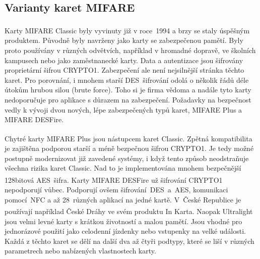 \subsection{Varianty karet MIFARE}

Karty MIFARE Classic\textsuperscript{\textregistered} byly vyvinuty již v roce~1994 a brzy se staly úspěšným produktem. Původně byly navrženy jako karty se zabezpečenou pamětí. Byly proto používány v různých odvětvích, například v hromadné dopravě, ve školních kampusech nebo jako zaměstnanecké karty. Data a autentizace jsou šifrovány proprietární šifrou CRYPTO1. Zabezpečení ale není nejsilnější stránka těchto karet. Pro porovnání, i mnohem starší DES~šifrování odolá o několik řádů déle útokům hrubou silou (brute force). Toho si je firma vědoma a nadále tyto karty nedoporučuje pro aplikace s důrazem na zabezpečení. Požadavky na bezpečnost vedly k vývoji dvou nových, lépe zabezpečených typů karet, MIFARE Plus a MIFARE DESFire\cite{Mifare_Classic_story}\cite{MIFARE_Classic_Official_about}. 
\par
Chytré karty MIFARE Plus\textsuperscript{\textregistered} jsou nástupcem karet Classic. Zpětná kompatibilita je zajištěna podporou starší a méně bezpečnou šifrou CRYPTO1. Je tedy možné postupně modernizovat již zavedené systémy, i když tento způsob neodstraňuje všechna rizika karet Classic. Nad to je implementována mnohem bezpečnější 128bitová AES~šifra\cite{MIFARE_Plus_Official}. Karty MIFARE DESFire\textsuperscript{\textregistered} už šifrování CRYPTO1 nepodporují vůbec. Podporují ovšem šifrování~DES~a~AES, komunikaci pomocí~NFC a až 28~různých aplikací na jedné kartě\cite{MIFARE_DESFire_Official}. V~České Republice je používají například České Dráhy ve svém produktu In Karta\cite{Ceske_Drahy_Podminky_InKarta}. Naopak Ultralight\textsuperscript{\textregistered} jsou velmi levné karty s krátkou životností a malou pamětí. Jsou vhodné pro jednorázové použití jako celodenní jízdenky nebo vstupenky na velké události\cite{MIFARE_Ultralight_Official}. Každá z těchto karet se dělí na další dva až čtyři podtypy, které se liší v různých parametrech nebo nabízených vlastnostech karty.

